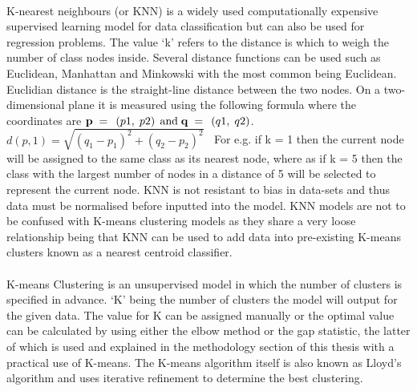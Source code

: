 \paragraph{}K-nearest neighbours (or KNN) is a widely used computationally expensive supervised learning model for data classification but can also be used for regression problems. The value ‘k’ refers to the distance is which to weigh the number of class nodes inside. Several distance functions can be used such as Euclidean, Manhattan and Minkowski with the most common being Euclidean. Euclidian distance is the straight-line distance between the two nodes. On a two-dimensional plane it is measured using the following formula where the coordinates are ${\bf{p}}{\rm{\;}} = {\rm{\;}}\left( {p1,{\rm{\;}}p2} \right){\rm{\;and\;}}{\bf{q}}{\rm{\;}} = {\rm{\;}}\left( {q1,{\rm{\;}}q2} \right)$.
$d\left( {p,1} \right) = \sqrt {{{\left( {{q_1} - {p_1}} \right)}^2} + {{\left( {{q_2} - {p_2}} \right)}^2}} \;\;$
For e.g. if k = 1 then the current node will be assigned to the same class as its nearest node, where as if k = 5 then the class with the largest number of nodes in a distance of 5 will be selected to represent the current node. KNN is not resistant to bias in data-sets and thus data must be normalised before inputted into the model. KNN models are not to be confused with K-means clustering models as they share a very loose relationship being that KNN can be used to add data into pre-existing K-means clusters known as a nearest centroid classifier.

\paragraph{}K-means Clustering is an unsupervised model in which the number of clusters is specified in advance. ‘K’ being the number of clusters the model will output for the given data. The value for K can be assigned manually or the optimal value can be calculated by using either the elbow method or the gap statistic, the latter of which is used and explained in the methodology section of this thesis with a practical use of K-means. The K-means algorithm itself is also known as Lloyd's algorithm and uses iterative refinement to determine the best clustering.

